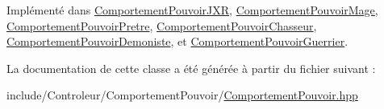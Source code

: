 \-Implémenté dans \hyperlink{class_comportement_pouvoir_j_x_r_a3d40cb49543bd69accaa1ddfb09aa9cc}{\-Comportement\-Pouvoir\-J\-X\-R}, \hyperlink{class_comportement_pouvoir_mage_a8a85b640972603a96f87222306e57e7d}{\-Comportement\-Pouvoir\-Mage}, \hyperlink{class_comportement_pouvoir_pretre_a24e87d9b2cb5ab4116d67ace5d3c9687}{\-Comportement\-Pouvoir\-Pretre}, \hyperlink{class_comportement_pouvoir_chasseur_a334058c088f33d706f636cadd97150da}{\-Comportement\-Pouvoir\-Chasseur}, \hyperlink{class_comportement_pouvoir_demoniste_a85abc906021128b61ba1c292921c411d}{\-Comportement\-Pouvoir\-Demoniste}, et \hyperlink{class_comportement_pouvoir_guerrier_a2747bbff54360379e100aa62254a2a79}{\-Comportement\-Pouvoir\-Guerrier}.



\-La documentation de cette classe a été générée à partir du fichier suivant \-:\begin{DoxyCompactItemize}
\item 
include/\-Controleur/\-Comportement\-Pouvoir/\hyperlink{_comportement_pouvoir_8hpp}{\-Comportement\-Pouvoir.\-hpp}\end{DoxyCompactItemize}
